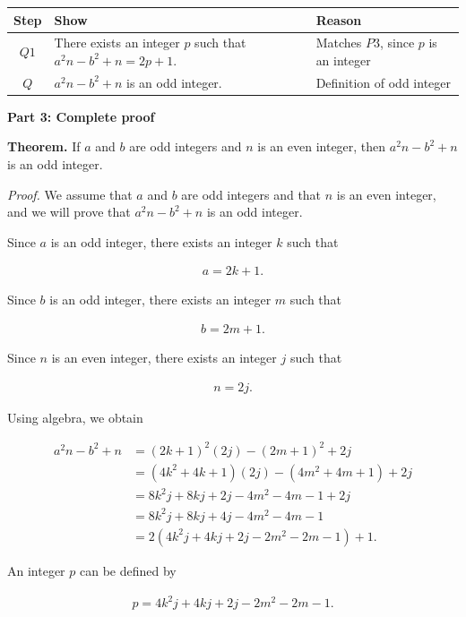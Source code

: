 \documentclass[10pt]{exam}
\begin{document}
\begin{questions}
\begin{solution}
\begin{center}
\begin{tabular}{|c|p{7cm}|p{5cm}|}
\hline
Step & Show & Reason \\ \hline
$Q1$ & There exists an integer $p$ such that $a^2n - b^2 + n = 2p + 1$. & Matches $P3$, since $p$ is an integer \\ \hline
$Q$ & $a^2n - b^2 + n$ is an odd integer. & Definition of odd integer \\ \hline
\end{tabular}
\end{center}

\textbf{Part 3: Complete proof}

\textbf{Theorem.} If $a$ and $b$ are odd integers and $n$ is an even integer, then $a^2n - b^2 + n$ is an odd integer.

\textit{Proof.} We assume that $a$ and $b$ are odd integers and that $n$ is an even integer, and we will prove that $a^2n - b^2 + n$ is an odd integer.

Since $a$ is an odd integer, there exists an integer $k$ such that

\begin{align*}
a = 2k + 1.
\end{align*}

Since $b$ is an odd integer, there exists an integer $m$ such that

\begin{align*}
b = 2m + 1.
\end{align*}

Since $n$ is an even integer, there exists an integer $j$ such that

\begin{align*}
n = 2j.
\end{align*}

Using algebra, we obtain

\begin{align*}
a^2n - b^2 + n &= (2k+1)^2(2j) - (2m+1)^2 + 2j\\
&= (4k^2+4k+1)(2j) - (4m^2+4m+1) + 2j\\
&= 8k^2j + 8kj + 2j - 4m^2 - 4m - 1 + 2j\\
&= 8k^2j + 8kj + 4j - 4m^2 - 4m - 1\\
&= 2(4k^2j + 4kj + 2j - 2m^2 - 2m - 1) + 1.
\end{align*}

An integer $p$ can be defined by

\begin{align*}
p = 4k^2j + 4kj + 2j - 2m^2 - 2m - 1.
\end{align*}


\end{solution}
\end{questions}
\end{document}
